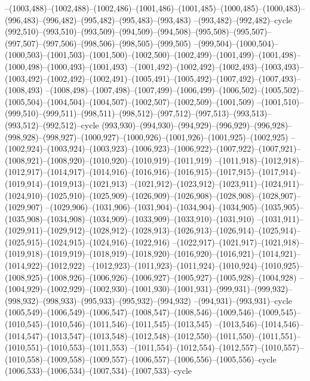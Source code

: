 --(1003,488)--(1002,488)--(1002,486)--(1001,486)--(1001,485)--(1000,485)--(1000,483)--(996,483)--(996,482)--(995,482)--(995,483)--(993,483)
--(993,482)--(992,482)--cycle
(992,510)--(993,510)--(993,509)--(994,509)--(994,508)--(995,508)--(995,507)--(997,507)--(997,506)--(998,506)--(998,505)--(999,505)
--(999,504)--(1000,504)--(1000,503)--(1001,503)--(1001,500)--(1002,500)--(1002,499)--(1001,499)--(1001,498)--(1000,498)--(1000,493)--(1001,493)
--(1001,492)--(1002,492)--(1002,493)--(1003,493)--(1003,492)--(1002,492)--(1002,491)--(1005,491)--(1005,492)--(1007,492)--(1007,493)--(1008,493)
--(1008,498)--(1007,498)--(1007,499)--(1006,499)--(1006,502)--(1005,502)--(1005,504)--(1004,504)--(1004,507)--(1002,507)--(1002,509)--(1001,509)
--(1001,510)--(999,510)--(999,511)--(998,511)--(998,512)--(997,512)--(997,513)--(993,513)--(993,512)--(992,512)--cycle
(993,930)--(994,930)--(994,929)--(996,929)--(996,928)--(998,928)--(998,927)--(1000,927)--(1000,926)--(1001,926)--(1001,925)--(1002,925)
--(1002,924)--(1003,924)--(1003,923)--(1006,923)--(1006,922)--(1007,922)--(1007,921)--(1008,921)--(1008,920)--(1010,920)--(1010,919)--(1011,919)
--(1011,918)--(1012,918)--(1012,917)--(1014,917)--(1014,916)--(1016,916)--(1016,915)--(1017,915)--(1017,914)--(1019,914)--(1019,913)--(1021,913)
--(1021,912)--(1023,912)--(1023,911)--(1024,911)--(1024,910)--(1025,910)--(1025,909)--(1026,909)--(1026,908)--(1028,908)--(1028,907)--(1029,907)
--(1029,906)--(1031,906)--(1031,904)--(1034,904)--(1034,905)--(1035,905)--(1035,908)--(1034,908)--(1034,909)--(1033,909)--(1033,910)--(1031,910)
--(1031,911)--(1029,911)--(1029,912)--(1028,912)--(1028,913)--(1026,913)--(1026,914)--(1025,914)--(1025,915)--(1024,915)--(1024,916)--(1022,916)
--(1022,917)--(1021,917)--(1021,918)--(1019,918)--(1019,919)--(1018,919)--(1018,920)--(1016,920)--(1016,921)--(1014,921)--(1014,922)--(1012,922)
--(1012,923)--(1011,923)--(1011,924)--(1010,924)--(1010,925)--(1008,925)--(1008,926)--(1006,926)--(1006,927)--(1005,927)--(1005,928)--(1004,928)
--(1004,929)--(1002,929)--(1002,930)--(1001,930)--(1001,931)--(999,931)--(999,932)--(998,932)--(998,933)--(995,933)--(995,932)--(994,932)
--(994,931)--(993,931)--cycle
(1005,549)--(1006,549)--(1006,547)--(1008,547)--(1008,546)--(1009,546)--(1009,545)--(1010,545)--(1010,546)--(1011,546)--(1011,545)--(1013,545)
--(1013,546)--(1014,546)--(1014,547)--(1013,547)--(1013,548)--(1012,548)--(1012,550)--(1011,550)--(1011,551)--(1010,551)--(1010,553)--(1011,553)
--(1011,554)--(1012,554)--(1012,557)--(1010,557)--(1010,558)--(1009,558)--(1009,557)--(1006,557)--(1006,556)--(1005,556)--cycle
(1006,533)--(1006,534)--(1007,534)--(1007,533)--cycle
